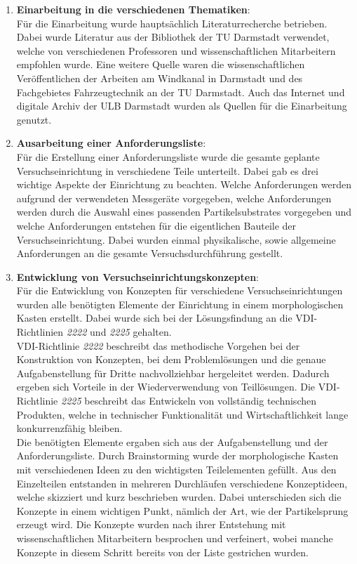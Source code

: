 \begin{enumerate}
\item \textbf{Einarbeitung in die verschiedenen Thematiken}:\\
F\"{u}r die Einarbeitung wurde haupts\"{a}chlich Literaturrecherche betrieben. Dabei wurde Literatur aus der Bibliothek der TU Darmstadt verwendet, welche von verschiedenen Professoren und wissenschaftlichen Mitarbeitern empfohlen wurde. Eine weitere Quelle waren die wissenschaftlichen Ver\"{o}ffentlichen der Arbeiten am Windkanal in Darmstadt und des Fachgebietes Fahrzeugtechnik an der TU Darmstadt. Auch das Internet und digitale Archiv der ULB Darmstadt wurden als Quellen f\"{u}r die Einarbeitung genutzt.
\item \textbf{Ausarbeitung einer Anforderungsliste}:\\
F\"{u}r die Erstellung einer Anforderungsliste wurde die gesamte geplante Versuchseinrichtung in verschiedene Teile unterteilt. Dabei gab es drei wichtige Aspekte der Einrichtung zu beachten. Welche Anforderungen werden aufgrund der verwendeten Messger\"{a}te vorgegeben, welche Anforderungen werden durch die Auswahl eines passenden Partikelsubstrates vorgegeben und welche Anforderungen entstehen f\"{u}r die eigentlichen Bauteile der Versuchseinrichtung. Dabei wurden einmal physikalische, sowie allgemeine Anforderungen an die gesamte Versuchsdurchf\"{u}hrung gestellt.
\item \textbf{Entwicklung von Versuchseinrichtungskonzepten}:\\
F\"{u}r die Entwicklung von Konzepten f\"{u}r verschiedene Versuchseinrichtungen wurden alle ben\"{o}tigten Elemente der Einrichtung in einem morphologischen Kasten erstellt. Dabei wurde sich bei der L\"{o}sungsfindung an die VDI-Richtlinien \textit{2222} und \textit{2225} gehalten.\\
VDI-Richtlinie \textit{2222} beschreibt das methodische Vorgehen bei der Konstruktion von Konzepten, bei dem Probleml\"{o}sungen und die genaue Aufgabenstellung f\"{u}r Dritte nachvollziehbar hergeleitet werden. Dadurch ergeben sich Vorteile in der Wiederverwendung von Teill\"{o}sungen. Die VDI-Richtlinie \textit{2225} beschreibt das Entwickeln von vollst\"{a}ndig technischen Produkten, welche in technischer Funktionalit\"{a}t und Wirtschaftlichkeit lange konkurrenzf\"{a}hig bleiben.\\
Die ben\"{o}tigten Elemente ergaben sich aus der Aufgabenstellung und der Anforderungsliste. Durch Brainstorming wurde der morphologische Kasten mit verschiedenen Ideen zu den wichtigsten Teilelementen gef\"{u}llt. Aus den Einzelteilen entstanden in mehreren Durchl\"{a}ufen verschiedene Konzeptideen, welche skizziert und kurz beschrieben wurden. Dabei unterschieden sich die Konzepte in einem wichtigen Punkt, n\"{a}mlich der Art, wie der Partikelsprung erzeugt wird. Die Konzepte wurden nach ihrer Entstehung mit wissenschaftlichen Mitarbeitern besprochen und verfeinert, wobei manche Konzepte in diesem Schritt bereits von der Liste gestrichen wurden.

\end{enumerate}
